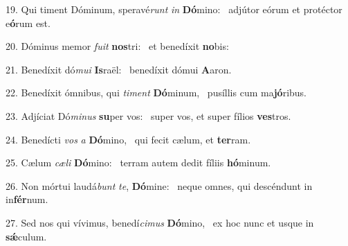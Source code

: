 19. Qui timent Dóminum, speravé\textit{runt} \textit{in} \textbf{Dó}mino: \ast\  adjútor eórum et protéctor e\textbf{ó}rum est.\

20. Dóminus memor \textit{fu}\textit{it} \textbf{nos}tri: \ast\  et benedíxit \textbf{no}bis:\

21. Benedíxit dó\textit{mu}\textit{i} \textbf{Is}raël: \ast\  benedíxit dómui \textbf{A}aron.\

22. Benedíxit ómnibus, qui \textit{ti}\textit{ment} \textbf{Dó}minum, \ast\  pusíllis cum ma\textbf{jó}ribus.\

23. Adjíciat Dó\textit{mi}\textit{nus} \textbf{su}per vos: \ast\  super vos, et super fílios \textbf{ves}tros.\

24. Benedícti \textit{vos} \textit{a} \textbf{Dó}mino, \ast\  qui fecit cælum, et \textbf{ter}ram.\

25. Cælum \textit{cæ}\textit{li} \textbf{Dó}mino: \ast\  terram autem dedit fíliis \textbf{hó}minum.\

26. Non mórtui laudá\textit{bunt} \textit{te}, \textbf{Dó}mine: \ast\  neque omnes, qui descéndunt in in\textbf{fér}num.\

27. Sed nos qui vívimus, benedí\textit{ci}\textit{mus} \textbf{Dó}mino, \ast\  ex hoc nunc et usque in \textbf{sǽ}culum.\

